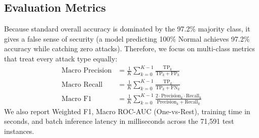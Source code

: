 \subsection{Evaluation Metrics}
Because standard overall accuracy is dominated by the 97.2\% majority class, it gives a false sense of security (a model predicting 100\% Normal achieves 97.2\% accuracy while catching zero attacks). Therefore, we focus on multi-class metrics that treat every attack type equally:
\begin{align}
\text{Macro Precision} &= \frac{1}{K}\sum_{k=0}^{K-1} \frac{\text{TP}_k}{\text{TP}_k + \text{FP}_k} \\
\text{Macro Recall} &= \frac{1}{K}\sum_{k=0}^{K-1} \frac{\text{TP}_k}{\text{TP}_k + \text{FN}_k} \\
\text{Macro F1} &= \frac{1}{K}\sum_{k=0}^{K-1} \frac{2 \cdot \text{Precision}_k \cdot \text{Recall}_k}{\text{Precision}_k + \text{Recall}_k}
\end{align}
We also report Weighted F1, Macro ROC-AUC (One-vs-Rest), training time in seconds, and batch inference latency in milliseconds across the 71,591 test instances.
